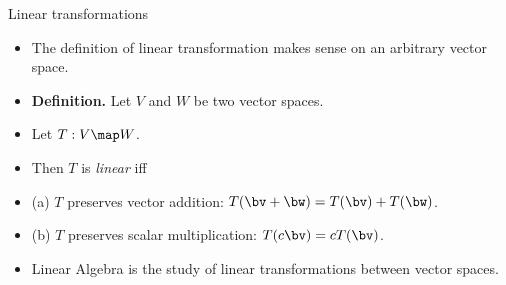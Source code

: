 \documentclass{beamer}
\begin{document}
\begin{frame}{Linear transformations}

\begin{itemize}
\item The definition of linear transformation makes sense on an arbitrary vector space.
\item \textbf{Definition.} Let $V$ and $W$ be two vector spaces.
\item Let $T:V\map W$.
\item Then $T$ is \emph{linear} iff
\item (a) $T$ preserves vector addition: $T(\bv+\bw) = T(\bv) + T(\bw)$.
\item (b) $T$ preserves scalar multiplication: $T(c\bv) = c T(\bv)$.
\item Linear Algebra is the study of linear transformations between vector spaces.
\end{itemize}

\end{frame}
\end{document}
